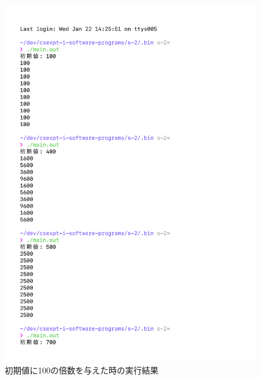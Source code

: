 \begin{figure}[H]
    \ContinuedFloat
    \centering
    \includegraphics[width=0.8\hsize, pagebox=mediabox, page=2]{main_result2_img.pdf}
    \caption{初期値に100の倍数を与えた時の実行結果}
    \label{初期値に100の倍数を与えた時の実行結果}
\end{figure}
